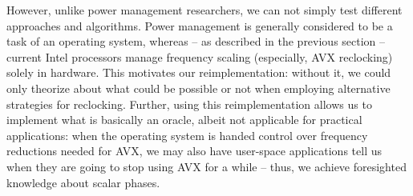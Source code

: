 {However, unlike power management researchers, we can not simply test different approaches and algorithms. Power management is generally considered to be a task of an operating system, whereas -- as described in the previous section -- current Intel processors manage frequency scaling (especially, \gls{AVX} reclocking) solely in hardware. This motivates our reimplementation: without it, we could only theorize about what could be possible or not when employing alternative strategies for reclocking. Further, using this reimplementation allows us to implement what is basically an oracle, albeit not applicable for practical applications: when the operating system is handed control over frequency reductions needed for \gls{AVX}, we may also have user-space applications tell us when they are going to stop using \gls{AVX} for a while -- thus, we achieve foresighted knowledge about scalar phases.

}
